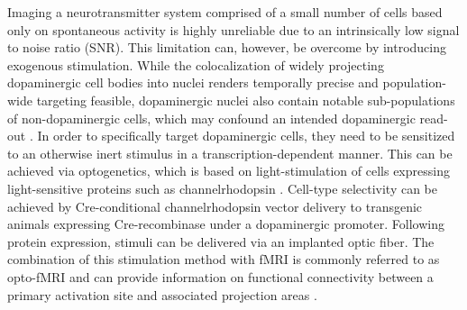 %

Imaging a neurotransmitter system comprised of a small number of cells based only on spontaneous activity is highly unreliable due to an intrinsically low signal to noise ratio (SNR).
This limitation can, however, be overcome by introducing exogenous stimulation.
While the colocalization of widely projecting dopaminergic cell bodies into nuclei renders temporally precise and population-wide targeting feasible, dopaminergic nuclei also contain notable sub-populations of non-dopaminergic cells, which may confound an intended dopaminergic read-out \cite{Taylor2014}.
In order to specifically target dopaminergic cells, they need to be sensitized to an otherwise inert stimulus in a transcription-dependent manner.
This can be achieved via optogenetics, which is based on light-stimulation of cells expressing light-sensitive proteins such as channelrhodopsin \cite{Boyden2005}.
Cell-type selectivity can be achieved by Cre-conditional channelrhodopsin vector delivery \cite{Orban1992} to transgenic animals expressing Cre-recombinase under a dopaminergic promoter.
Following protein expression, stimuli can be delivered via an implanted optic fiber.
The combination of this stimulation method with fMRI is commonly referred to as opto-fMRI and can provide information on functional connectivity between a primary activation site and associated projection areas \cite{Desai2011,Grandjean2019}.

